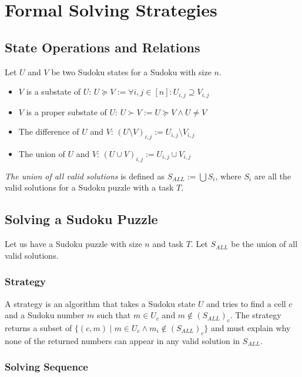 \chapter{Formal Solving Strategies}\label{ch:4}

\section{State Operations and Relations}

Let $U$ and $V$ be two Sudoku states for a Sudoku with size $n$.

\begin{itemize}
    \item $V$ is a substate of $U$: $U \succeq V := \forall i, j \in [n]: U_{i, j} \supseteq V_{i, j}$
    \item $V$ is a proper substate of $U$: $U \succ V := U \succeq V \land U \neq V$
    \item The difference of $U$ and $V$: $(U \setminus V)_{i, j} := U_{i, j} \setminus V_{i, j}$
    \item The union of $U$ and $V$: $(U \cup V)_{i, j} := U_{i, j} \cup V_{i, j}$
\end{itemize}

\begin{defn}
    \emph{The union of all valid solutions} is defined as $S_{ALL} := \bigcup S_i$, where
    $S_i$ are all the valid solutions for a Sudoku puzzle with a task $T$.
\end{defn}

\section{Solving a Sudoku Puzzle}

Let us have a Sudoku puzzle with size $n$ and task $T$.
Let $S_{ALL}$ be the union of all valid solutions.

\subsection*{Strategy}

A strategy is an algorithm that takes a Sudoku state $U$ and tries to find a cell $c$
and a Sudoku number $m$ such that $m \in U_c$ and $m \notin (S_{ALL})_c$.
The strategy returns a subset of
$\{(c, m) \mid m \in U_c \land m_i \notin (S_{ALL})_c\}$
and must explain why none of the returned numbers can appear in any valid solution in $S_{ALL}$.

\subsection*{Solving Sequence}

